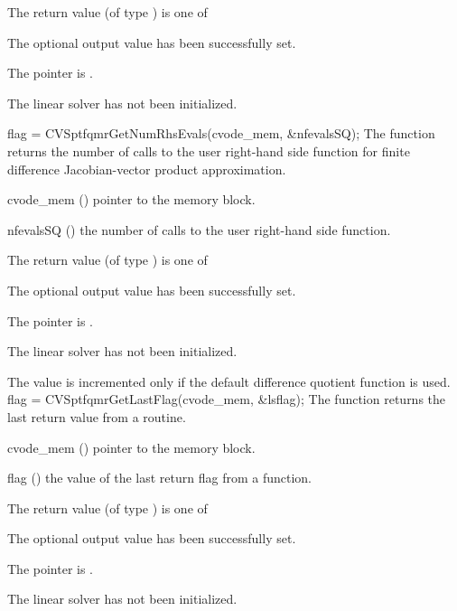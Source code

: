 {
  The return value  (of type ) is one of
  \begin{args}
  \item[\Id{CVSPTFQMR\_SUCCESS}] 
    The optional output value has been successfully set.
  \item[\Id{CVSPTFQMR\_MEM\_NULL}]
    The  pointer is .
  \item[\Id{CVSPTFQMR\_LMEM\_NULL}]
    The {\cvsptfqmr} linear solver has not been initialized.
  \end{args}
}
{}
{
  flag = CVSptfqmrGetNumRhsEvals(cvode\_mem, \&nfevalsSQ);
}
{
  The function  returns the
  number of calls to the user right-hand side function for
  finite difference Jacobian-vector product approximation.
}
{
  \begin{args}
  \item[cvode\_mem] ()
    pointer to the {\cvode} memory block.
  \item[nfevalsSQ] ()
    the number of calls to the user right-hand side function.
  \end{args}
}
{
  The return value  (of type ) is one of
  \begin{args}
  \item[\Id{CVSPTFQMR\_SUCCESS}] 
    The optional output value has been successfully set.
  \item[\Id{CVSPTFQMR\_MEM\_NULL}]
    The  pointer is .
  \item[\Id{CVSPTFQMR\_LMEM\_NULL}]
    The {\cvsptfqmr} linear solver has not been initialized.
  \end{args}
}
{
  The value  is incremented only if the default 
   difference quotient function is used.
}
{
  flag = CVSptfqmrGetLastFlag(cvode\_mem, \&lsflag);
}
{
  The function  returns the
  last return value from a {\cvsptfqmr} routine. 
}
{
  \begin{args}
  \item[cvode\_mem] ()
    pointer to the {\cvode} memory block.
  \item[flag] ()
    the value of the last return flag from a {\cvsptfqmr} function.
  \end{args}
}
{
  The return value  (of type ) is one of
  \begin{args}
  \item[\Id{CVSPTFQMR\_SUCCESS}] 
    The optional output value has been successfully set.
  \item[\Id{CVSPTFQMR\_MEM\_NULL}]
    The  pointer is .
  \item[\Id{CVSPTFQMR\_LMEM\_NULL}]
    The {\cvsptfqmr} linear solver has not been initialized.
  \end{args}
}
